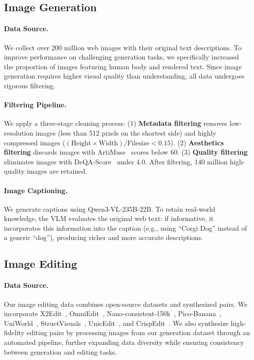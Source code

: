 \subsection{Image Generation}
\paragraph{Data Source.}
We collect over 200 million web images with their original text descriptions.
%
To improve performance on challenging generation tasks, we specifically increased the proportion of images featuring human body and rendered text.
%
Since image generation requires higher visual quality than understanding, all data undergoes rigorous filtering.

\paragraph{Filtering Pipeline.}
We apply a three-stage cleaning process:
%
(1) \textbf{Metadata filtering} removes low-resolution images (less than 512 pixels on the shortest side) and highly compressed images ($(\text{Height} \times \text{Width}) / \text{Filesize} < 0.15$).
%
(2) \textbf{Aesthetics filtering} discards images with ArtiMuse~\citep{cao2025artimusefinegrainedimageaesthetics} scores below 60.
%
(3) \textbf{Quality filtering} eliminates images with DeQA-Score~\citep{deqa_score} under 4.0.
%
After filtering, 140 million high-quality images are retained.

\paragraph{Image Captioning.} 
We generate captions using Qwen3-VL-235B-22B.
%
To retain real-world knowledge, the VLM evaluates the original web text: if informative, it incorporates this information into the caption (e.g., using ``Corgi Dog'' instead of a generic ``dog''), producing richer and more accurate descriptions.



\subsection{Image Editing}
\paragraph{Data Source.} 
Our image editing data combines open-source datasets and synthesized pairs.
%
We incorporate X2Edit~\citep{ma2026x2edit}, OmniEdit~\citep{wei2024omniedit}, Nano-consistent-150k~\citep{ye2025echo}, Pico-Banana~\citep{qian2025pico}, UniWorld~\citep{lin2025uniworld}, StructVisuals~\citep{zhuo2025factuality}, UnicEdit~\citep{ye2025unicedit}, and CrispEdit~\citep{chow2025editmgt}.
%
We also synthesize high-fidelity editing pairs by processing images from our generation dataset through an automated pipeline, further expanding data diversity while ensuring consistency between generation and editing tasks.

